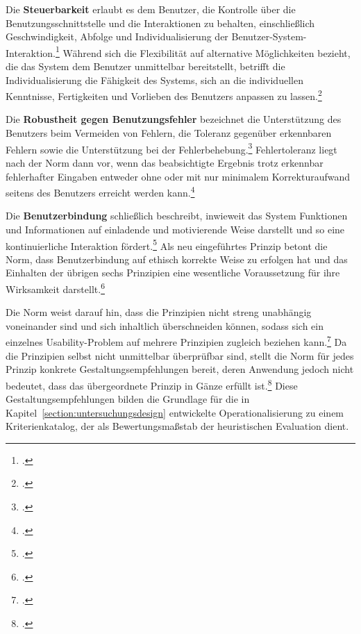 Die \textbf{Steuerbarkeit} erlaubt es dem Benutzer, die Kontrolle über die Benutzungsschnittstelle und die Interaktionen zu behalten, 
einschließlich Geschwindigkeit, Abfolge und Individualisierung der 
Benutzer-System-Interaktion.\footcite[Vgl.][Abschnitt 5.5.1]{DIN_ISO_9241-110:2020} Während sich die Flexibilität auf alternative Möglichkeiten 
bezieht, die das System dem Benutzer unmittelbar bereitstellt, betrifft die Individualisierung die Fähigkeit des Systems, sich an die 
individuellen Kenntnisse, Fertigkeiten und Vorlieben des Benutzers anpassen zu lassen.\footcite[Vgl.][Abschnitt 5.5.1]{DIN_ISO_9241-110:2020}

Die \textbf{Robustheit gegen Benutzungsfehler} bezeichnet die Unterstützung des Benutzers beim Vermeiden von Fehlern, die Toleranz gegenüber 
erkennbaren Fehlern sowie die Unterstützung bei der Fehlerbehebung.\footcite[Vgl.][Abschnitt 5.6.1]{DIN_ISO_9241-110:2020} Fehlertoleranz liegt 
nach der Norm dann vor, wenn das beabsichtigte Ergebnis trotz erkennbar fehlerhafter Eingaben entweder ohne oder mit nur minimalem 
Korrekturaufwand seitens des Benutzers erreicht werden kann.\footcite[Vgl.][Abschnitt 5.6.1]{DIN_ISO_9241-110:2020}

Die \textbf{Benutzerbindung} schließlich beschreibt, inwieweit das System Funktionen und Informationen auf einladende und motivierende Weise 
darstellt und so eine kontinuierliche Interaktion fördert.\footcite[Vgl.][Abschnitt 5.7.1]{DIN_ISO_9241-110:2020} Als neu eingeführtes Prinzip 
betont die Norm, dass Benutzerbindung auf ethisch korrekte Weise zu erfolgen hat und das Einhalten der übrigen sechs Prinzipien eine wesentliche 
Voraussetzung für ihre Wirksamkeit darstellt.\footcite[Vgl.][Abschnitt 5.7.1]{DIN_ISO_9241-110:2020}

Die Norm weist darauf hin, dass die Prinzipien nicht streng unabhängig voneinander sind und sich inhaltlich überschneiden können, sodass sich ein 
einzelnes Usability-Problem auf mehrere Prinzipien zugleich beziehen kann.\footcite[Vgl.][Abschnitt 4.5]{DIN_ISO_9241-110:2020} Da die Prinzipien 
selbst nicht unmittelbar überprüfbar sind, stellt die Norm für jedes Prinzip konkrete Gestaltungsempfehlungen bereit, deren Anwendung jedoch 
nicht bedeutet, dass das übergeordnete Prinzip in Gänze erfüllt ist.\footcite[Vgl.][Abschnitt 4.1]{DIN_ISO_9241-110:2020} Diese 
Gestaltungsempfehlungen bilden die Grundlage für die in Kapitel~\ref{section:untersuchungsdesign} entwickelte Operationalisierung zu einem 
Kriterienkatalog, der als Bewertungsmaßstab der heuristischen Evaluation dient.


